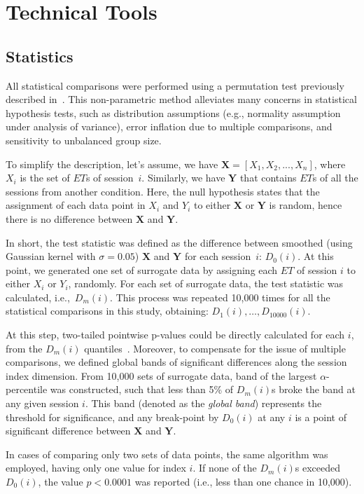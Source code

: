 \section{Technical Tools} \label{ch:methods:tech}

\subsection{Statistics}
All statistical comparisons were performed using a permutation test previously described in~\cite{Fujisawa2008NN}.
This non-parametric method alleviates many concerns in statistical hypothesis tests, such as distribution assumptions (e.g., normality assumption under analysis of variance), error inflation due to multiple comparisons, and sensitivity to unbalanced group size.
\par
To simplify the description, let's assume, we have ${\mathbf{X}=[X_1, X_2,...,X_n]}$, where $X_i$ is the set of $ET$s of session~$i$.
Similarly, we have $\mathbf{Y}$ that contains $ET$s of all the sessions from another condition.
Here, the null hypothesis states that the assignment of each data point in $X_i$ and $Y_i$ to either $\mathbf{X}$ or $\mathbf{Y}$ is random, hence there is no difference between $\mathbf{X}$ and $\mathbf{Y}$.
\par
In short, the test statistic was defined as the difference between smoothed (using Gaussian kernel with $\sigma =0.05$) $\mathbf{X}$ and $\mathbf{Y}$ for each session~$i$: $D_0(i)$.
At this point, we generated one set of surrogate data by assigning each $ET$ of session $i$ to either $X_i$ or $Y_i$, randomly.
For each set of surrogate data, the test statistic was calculated, i.e.,~$D_m(i)$.
This process was repeated 10,000 times for all the statistical comparisons in this study, obtaining: $D_1(i),\ldots,D_{10000}(i)$.
\par
At this step, two-tailed pointwise p-values could be directly calculated for each $i$, from the $D_m(i)$ quantiles~\cite[see][]{Fujisawa2008NN}.
Moreover, to compensate for the issue of multiple comparisons, we defined global bands of significant differences along the session index dimension.
From 10,000 sets of surrogate data, band of the largest $\alpha$-percentile was constructed, such that less than 5\% of $D_m(i)$s broke the band at any given session $i$.
This band (denoted as the \textit{global band}) represents the threshold for significance, and any break-point by $D_0(i)$ at any $i$ is a point of significant difference between $\mathbf{X}$ and $\mathbf{Y}$.
\par
In cases of comparing only two sets of data points, the same algorithm was employed, having only one value for index $i$.
If none of the $D_m(i)$s exceeded $D_0(i)$, the value $p<0.0001$ was reported (i.e., less than one chance in 10,000).
